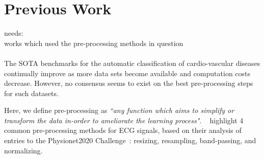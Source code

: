 \documentclass[pmlr,twocolumn]{jmlr}%
\begin{document}
\begin{table}[tbp]
\label{tab:top5}
{\caption{Top 5 teams in Physionet2020 and pre-processing functions used.}}%
    
    { 
}
\end{table}


\section{Previous Work}
{\color{red} needs: \\
works which used the pre-processing methods in question\\}\\
\label{sec:prevwork}
The SOTA benchmarks for the automatic classification of cardio-vascular diseases continually improve as more data sets become available and computation costs decrease. However, no consensus seems to exist on the best pre-processing steps for such datasets. 

Here, we define pre-processing as \textit{``any function which aims to simplify or transform the data in-order to ameliorate the learning process"}. ~\cite{hong2022practical} highlight 4 common pre-processing methods for ECG signals, based on their analysis of entries to the Physionet2020 Challenge~\cite{goldberger2000physiobank,alday2020classification}: resizing, resampling, band-passing, and normalizing.
\end{document}
